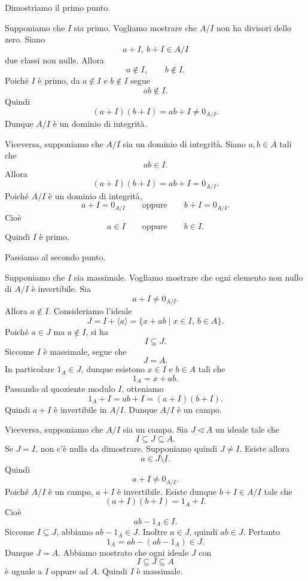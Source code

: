 \documentclass[a4paper]{article}
\begin{document}
\begin{radioactive}
\begin{snippetproof}{}
    Dimostriamo il primo punto.

    Supponiamo che \(I\) sia primo. Vogliamo mostrare che \(A/I\) non ha divisori dello zero.
    Siano
    \[
        a+I,\ b+I\in A/I
    \]
    due classi non nulle. Allora
    \[
        a\notin I,
        \qquad
        b\notin I.
    \]
    Poiché \(I\) è primo, da \(a\notin I\) e \(b\notin I\) segue
    \[
        ab\notin I.
    \]
    Quindi
    \[
        (a+I)(b+I)=ab+I\neq 0_{A/I}.
    \]
    Dunque \(A/I\) è un dominio di integrità.

    Viceversa, supponiamo che \(A/I\) sia un dominio di integrità. Siano \(a,b\in A\) tali che
    \[
        ab\in I.
    \]
    Allora
    \[
        (a+I)(b+I)=ab+I=0_{A/I}.
    \]
    Poiché \(A/I\) è un dominio di integrità,
    \[
        a+I=0_{A/I}
        \qquad
        \text{oppure}
        \qquad
        b+I=0_{A/I}.
    \]
    Cioè
    \[
        a\in I
        \qquad
        \text{oppure}
        \qquad
        b\in I.
    \]
    Quindi \(I\) è primo.

    Passiamo al secondo punto.

    Supponiamo che \(I\) sia massimale. Vogliamo mostrare che ogni elemento non nullo di \(A/I\) è invertibile.
    Sia
    \[
        a+I\neq 0_{A/I}.
    \]
    Allora \(a\notin I\). Consideriamo l'ideale
    \[
        J=I+\langle a \rangle=\{x+ab\mid x\in I,\ b\in A\}.
    \]
    Poiché \(a\in J\) ma \(a\notin I\), si ha
    \[
        I\subsetneq J.
    \]
    Siccome \(I\) è massimale, segue che
    \[
        J=A.
    \]
    In particolare \(1_A\in J\), dunque esistono \(x\in I\) e \(b\in A\) tali che
    \[
        1_A=x+ab.
    \]
    Passando al quoziente modulo \(I\), otteniamo
    \[
        1_A+I=ab+I=(a+I)(b+I).
    \]
    Quindi \(a+I\) è invertibile in \(A/I\). Dunque \(A/I\) è un campo.

    Viceversa, supponiamo che \(A/I\) sia un campo. Sia \(J\triangleleft A\) un ideale tale che
    \[
        I\subseteq J\subseteq A.
    \]
    Se \(J=I\), non c'è nulla da dimostrare. Supponiamo quindi \(J\neq I\). Esiste allora
    \[
        a\in J\setminus I.
    \]
    Quindi
    \[
        a+I\neq 0_{A/I}.
    \]
    Poiché \(A/I\) è un campo, \(a+I\) è invertibile. Esiste dunque \(b+I\in A/I\) tale che
    \[
        (a+I)(b+I)=1_A+I.
    \]
    Cioè
    \[
        ab-1_A\in I.
    \]
    Siccome \(I\subseteq J\), abbiamo \(ab-1_A\in J\). Inoltre \(a\in J\), quindi \(ab\in J\).
    Pertanto
    \[
        1_A=ab-(ab-1_A)\in J.
    \]
    Dunque \(J=A\). Abbiamo mostrato che ogni ideale \(J\) con
    \[
        I\subseteq J\subseteq A
    \]
    è uguale a \(I\) oppure ad \(A\). Quindi \(I\) è massimale.
\end{snippetproof}
\end{radioactive}
\end{document}
